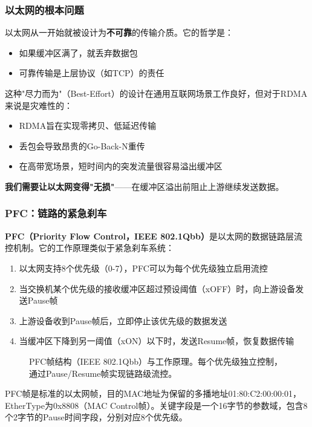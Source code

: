 \subsubsection{以太网的根本问题}

以太网从一开始就被设计为\textbf{不可靠}的传输介质。它的哲学是：
\begin{itemize}
    \item 如果缓冲区满了，就丢弃数据包
    \item 可靠传输是上层协议（如TCP）的责任
\end{itemize}

这种"尽力而为"（Best-Effort）的设计在通用互联网场景工作良好，但对于RDMA来说是灾难性的：
\begin{itemize}
    \item RDMA旨在实现零拷贝、低延迟传输
    \item 丢包会导致昂贵的Go-Back-N重传
    \item 在高带宽场景，短时间内的突发流量很容易溢出缓冲区
\end{itemize}

\textbf{我们需要让以太网变得"无损"}——在缓冲区溢出前阻止上游继续发送数据。

\subsubsection{PFC：链路的紧急刹车}

\textbf{PFC（Priority Flow Control，IEEE 802.1Qbb）}是以太网的数据链路层流控机制。它的工作原理类似于紧急刹车系统：

\begin{enumerate}
    \item 以太网支持8个优先级（0-7），PFC可以为每个优先级独立启用流控
    \item 当交换机某个优先级的接收缓冲区超过预设阈值（xOFF）时，向上游设备发送Pause帧
    \item 上游设备收到Pause帧后，立即停止该优先级的数据发送
    \item 当缓冲区下降到另一阈值（xON）以下时，发送Resume帧，恢复数据传输
\end{enumerate}

\begin{figure}[htbp]
\centering

\caption{PFC帧结构（IEEE 802.1Qbb）与工作原理。每个优先级独立控制，通过Pause/Resume帧实现链路级流控。}
\label{fig:pfc_mechanism}
\end{figure}

PFC帧是标准的以太网帧，目的MAC地址为保留的多播地址01:80:C2:00:00:01，EtherType为0x8808（MAC Control帧）。关键字段是一个16字节的参数域，包含8个2字节的Pause时间字段，分别对应8个优先级。

